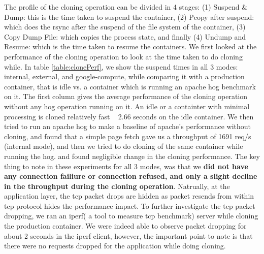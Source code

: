 The profile of the cloning operation can be divided in 4 stages: 
(1) Suspend \& Dump: this is the time taken to suspend the container, 
(2) Pcopy after suspend: which does the rsync after the suspend of the file system of the container, 
(3) Copy Dump File: which copies the process state, and finally 
(4) Undump and Resume: which is the time taken to resume the containers. 
We first looked at the performance of the cloning operation to look at the time taken to do cloning while. 
In table \ref {table:clonePerf}, we show the suspend times in all 3 modes: internal, external, and google-compute, while comparing it with a production container, that is idle vs. a container which is running an apache hog benchmark \cite{httperf} on it. 
The first column gives the average performance of the cloning operation without any hog operation running on it.  
An idle or a containter with minimal processing is cloned relatively fast ~ 2.66 seconds on the idle container. 
We then tried to run an apache hog to make a baseline of apache's performance without cloning, and found that a simple page fetch gave us a throughput of 1691 req/s (internal mode), and then we tried to do cloning of the same container while running the hog. and found negligible change in the cloning performance.
The key thing to note in these experiments for all 3 modes, was that we \textbf{did not have any connection failiure or connection refused, and only a slight decline in the throughput during the cloning operation}. 
Natrually, at the application layer, the tcp packet drops are hidden as packet resends from within tcp protocol hides the performance impact.
To further investigate the tcp packet dropping, we ran an iperf\cite{iprobe}( a tool to measure tcp benchmark) server while cloning the production container. 
We were indeed able to observe packet dropping for about 2 seconds in the iperf client, however, the important point to note is that there were no requests dropped for the application while doing cloning. 

